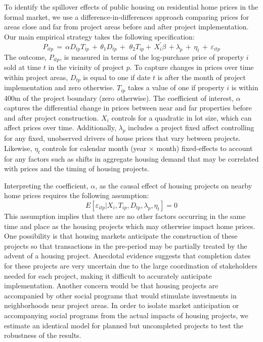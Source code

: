 \documentclass[12pt]{article}
\begin{document}
To identify the spillover effects of public housing on residential home prices in the formal market, we use a difference-in-differences approach comparing prices for areas close and far from project areas before and after project implementation.  Our main empirical strategy takes the following specification:
\begin{equation*}
P_{itp} \, = \, \alpha D_{tp}T_{ip} \, + \,\theta_1 D_{tp} \, + \, \,\theta_2 T_{ip}+ \, X^{'}_{i}\beta \, +  \lambda_p \,  + \, \eta_{t} \, + \, \varepsilon_{itp}
\end{equation*}
The outcome, $P_{itp}$, is measured in terms of the log-purchase price of property $i$ sold at time $t$ in the vicinity of project $p$.  To capture changes in prices over time within project areas, $D_{tp}$ is equal to one if date $t$ is after the month of project implementation and zero otherwise.  $T_{ip}$ takes a value of one if property $i$ is within 400m of the project boundary (zero otherwise).  The coefficient of interest, $\alpha$ captures the differential change in prices between near and far properties before and after project construction.  $X_i$ controls for a quadratic in lot size, which can affect prices over time.  Additionally, $\lambda_p$ includes a project fixed affect controlling for any fixed, unobserved drivers of house prices that vary between projects.  Likewise, $\eta_{t}$ controls for calendar month (year$\,\times\,$month) fixed-effects to account for any factors such as shifts in aggregate housing demand that may be correlated with prices and the timing of housing projects.

Interpreting the coefficient, $\alpha$, as the causal effect of housing projects on nearby home prices requires the following assumption:
\begin{equation*}
E[\varepsilon_{itp}|X_{i},T_{ip},D_{tp},\lambda_p,\eta_{t}]=0
\end{equation*}
This assumption implies that there are no other factors occurring in the same time and place as the housing projects which may otherwise impact home prices.  One possibility is that housing markets anticipate the construction of these projects so that transactions in the pre-period may be partially treated by the advent of a housing project.  Anecdotal evidence suggests that completion dates for these projects are very uncertain due to the large coordination of stakeholders needed for each project, making it difficult to accurately anticipate implementation.  Another concern would be that housing projects are accompanied by other social programs that would stimulate investments in neighborhoods near project areas.  In order to isolate market anticipation or accompanying social programs from the actual impacts of housing projects, we estimate an identical model for planned but uncompleted projects to test the robustness of the results.
\end{document}

